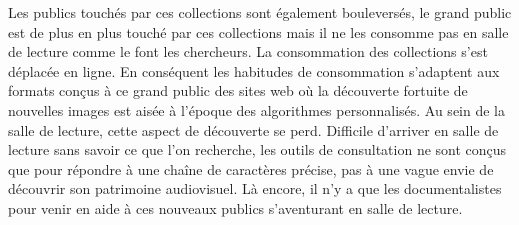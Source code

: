 Les publics touchés par ces collections sont également bouleversés, le grand public est de plus en plus touché par ces collections mais il ne les consomme pas en salle de lecture comme le font les chercheurs. La consommation des collections s'est déplacée en ligne. En conséquent les habitudes de consommation s'adaptent aux formats conçus à ce grand public des sites web où la découverte fortuite de nouvelles images est aisée à l'époque des algorithmes personnalisés. Au sein de la salle de lecture, cette aspect de découverte se perd. Difficile d'arriver en salle de lecture sans savoir ce que l'on recherche, les outils de consultation ne sont conçus que pour répondre à une chaîne de caractères précise, pas à une vague envie de découvrir son patrimoine audiovisuel. Là encore, il n'y a que les documentalistes pour venir en aide à ces nouveaux publics s'aventurant en salle de lecture. 